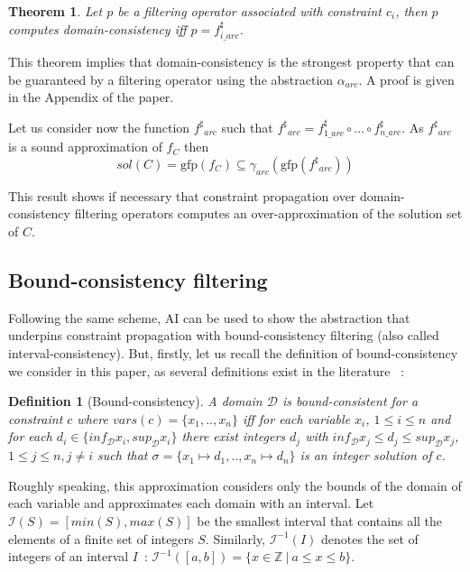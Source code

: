 \documentclass[submission,copyright,creativecommons]{eptcs}
\newtheorem{definition}{Definition}
\newtheorem{theorem}{Theorem}
\newcommand{\sh}[1]{\ensuremath{#1^\sharp}}
\newcommand{\gfp}{\ensuremath{\textrm{gfp}}}
\begin{document}
\begin{theorem}
\label{theo:arc}
  Let $p$ be a filtering operator associated with constraint $c_i$, then $p$ computes domain-consistency iff
  $p = \sh{f_{i\_arc}}$. 
\end{theorem}
\noindent
This theorem implies that domain-consistency is the strongest property that can be guaranteed by a filtering 
operator using the abstraction $\alpha_{arc}$. A proof is given in the Appendix of the paper.

\noindent
Let us consider now the function $\sh{f}_{arc}$ such that 
$\sh{f}_{arc} = \sh{f_{1\_arc}} \circ \ldots \circ \sh{f_{n\_arc}}$.
As $\sh{f}_{arc}$ is a sound approximation of $f_C$ then
$$ sol(C) = \gfp(f_C)  \subseteq \gamma_{arc}(\gfp(\sh{f}_{arc})) $$

\noindent
This result shows if necessary that constraint propagation over domain-consistency filtering 
operators computes an over-approximation of the solution set of $C$.


\subsection{Bound-consistency filtering}
\label{sec:bornes}

Following the same scheme, AI can be used to show the abstraction that underpins
constraint propagation with bound-consistency filtering (also called interval-consistency). But, firstly, let
us recall the definition of bound-consistency we consider in this paper, as several definitions exist in the 
literature \cite{CHL06}~:
\begin{definition}[Bound-consistency]
A domain $\mathcal{D}$ is bound-consistent for a constraint $c$ where $vars(c)=\{x_1,..,x_n\}$ 
iff for each variable $x_i$, $1 \leq i \leq n$ and for each $d_i \in \{inf_{\mathcal{D}} x_i, sup_{\mathcal{D}} x_i\}$
there exist integers $d_j$ with $inf_{\mathcal{D}} x_j\leq d_j \leq sup_{\mathcal{D}} x_j$, $1 \leq j \leq n, j \neq i$
such that $\sigma = \{x_1 \mapsto d_1, ..,x_n \mapsto d_n\}$ is an integer solution of $c$.
\end{definition}
\noindent 
Roughly speaking, this approximation considers only the bounds of the domain of each variable and
approximates each domain with an interval. 
Let $\mathcal{I}(S)= [min(S),max(S)]$ be the smallest interval that contains all the elements of a finite set of integers $S$.
Similarly, $\mathcal{I}^{-1}(I)$ denotes the set of integers of an interval $I$~: $\mathcal{I}^{-1}([a,b]) = \{x \in
\mathbb{Z}~|~a\leq x \leq b\}$. 
\end{document}
